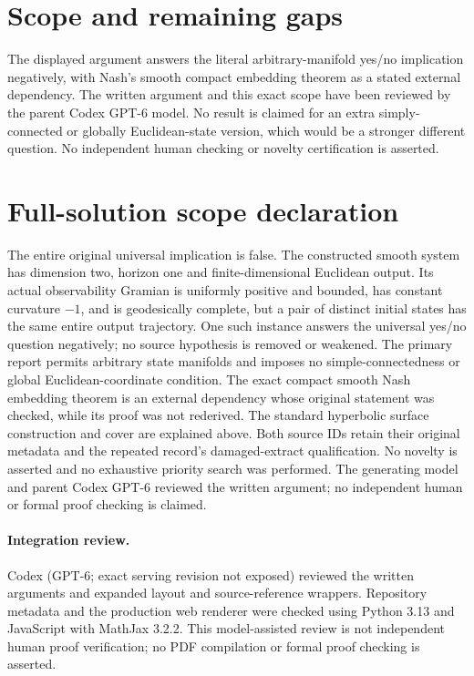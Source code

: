 \documentclass[11pt]{article}
\begin{document}
\section{Scope and remaining gaps}
The displayed argument answers the literal arbitrary-manifold yes/no implication negatively, with Nash's smooth compact embedding theorem as a stated external dependency. The written argument and this exact scope have been reviewed by the parent Codex GPT-6 model. No result is claimed for an extra simply-connected or globally Euclidean-state version, which would be a stronger different question. No independent human checking or novelty certification is asserted.
\section{Full-solution scope declaration}
The entire original universal implication is false. The constructed smooth system
has dimension two, horizon one and finite-dimensional Euclidean output. Its actual
observability Gramian is uniformly positive and bounded, has constant curvature
$-1$, and is geodesically complete, but a pair of distinct initial states has the
same entire output trajectory. One such instance answers the universal yes/no
question negatively; no source hypothesis is removed or weakened. The primary
report permits arbitrary state manifolds and imposes no simple-connectedness or
global Euclidean-coordinate condition. The exact compact smooth Nash embedding
theorem is an external dependency whose original statement was checked, while its
proof was not rederived. The standard hyperbolic surface construction and cover
are explained above. Both source IDs retain their original metadata and the
repeated record's damaged-extract qualification. No novelty is asserted and no
exhaustive priority search was performed. The generating model and parent Codex
GPT-6 reviewed the written argument; no independent human or formal proof checking
is claimed.
\paragraph{Integration review.} Codex (GPT-6; exact serving revision not exposed) reviewed the written arguments and expanded layout and source-reference wrappers. Repository metadata and the production web renderer were checked using Python 3.13 and JavaScript with MathJax 3.2.2. This model-assisted review is not independent human proof verification; no PDF compilation or formal proof checking is asserted.
\end{document}
